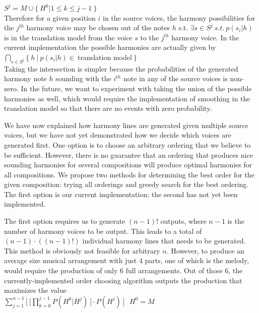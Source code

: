 \documentclass{sig-alternate}
\begin{document}
$S^{j} = {M} \cup \{\ H^k | 1 \leq k \leq j- 1\ \} $\\


Therefore for a given position $i$ in the source voices, the harmony possibilities for the $j^{th}$ harmony voice may be chosen out of the notes $h$ s.t. $\exists s \in S^{j}\ s.t.\ p(s_{i}|h)$ is in the translation model from the voice $s$ to the $j^{th}$ harmony voice. In the current implementation the possible harmonies are actually given by \\

$\bigcap_{s \in S^{j}} \{\ h\ |\ p(s_{i} | h) \in\ $translation model$\ \}$\\

Taking the intersection is simpler because the probabilities of the generated harmony note $h$ sounding with the $i^{th}$ note in any of the source voices is non-zero. In the future, we want to experiment with taking the union of the possible harmonies as well, which would require the implementation of smoothing in the translation model so that there are no events with zero probability. 

We have now explained how harmony lines are generated given multiple source voices, but we have not yet demonstrated how we decide which voices are generated first. One option is to choose an arbitrary ordering that we believe to be sufficient. However, there is no guarantee that an ordering that produces nice sounding harmonies for several compositions will produce optimal harmonies for all compositions. We propose two methods for determining the best order for the given composition: trying all orderings and greedy search for the best ordering. The first option is our current implementation; the second has not yet been implemented.

The first option requires us to generate $(n - 1)!$ outputs, where $n - 1$ is the number of harmony voices to be output. This leads to a total of $(n -1)\cdot((n-1)!)$ individual harmony lines that needs to be generated. This method is obviously not feasible for arbitrary $n$. However, to produce an average size musical arrangement with just $4$ parts, one of which is the melody, would require the production of only $6$ full arrangements. Out of those $6$, the currently-implemented order choosing algorithm outputs the production that maximizes the value\\

$\sum_{j = 1}^{n - 1} \lbrack\ \lbrack\prod_{k = 0}^{j - 1} P(H^{k} | H^{j})\ \rbrack \cdot P(H^{j})\ \rbrack\ \ \ H^{0} = M$\\
\end{document}

